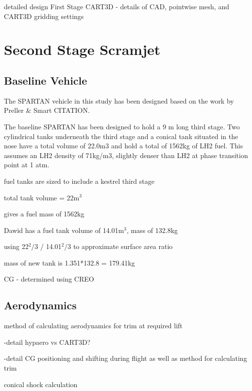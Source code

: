 	detailed design
	First Stage CART3D
	- details of CAD, pointwise mesh, and CART3D gridding settings
	
	
	\section{Second Stage Scramjet}
		\subsection{Baseline Vehicle}
		The SPARTAN vehicle in this study has been designed based on the work by Preller \& Smart CITATION. 
		
		The baseline SPARTAN has been designed to hold a 9 m long third stage.  Two cylindrical tanks underneath the third stage and a conical tank situated in the nose have a total volume of 22.0m3 and hold a total of 1562kg of LH2 fuel. This assumes an LH2 density of 71kg/m3, slightly denser than LH2 at phase transition point at 1 atm.
		
		
		
		
		
		
		
		fuel tanks are sized to include a kestrel third stage
		
		total tank volume = 22m$^3$
		
		gives a fuel mass of 1562kg
		
		
		
		Dawid has a fuel tank volume of 14.01m$^3$, mass of 132.8kg
		
		using 22$^2/3$  /  14.01$^2/3$  to approximate surface area ratio
		
		mass of new tank is 1.351*132.8 = 179.41kg
		
		
		CG - determined using CREO
		
		\subsection{Aerodynamics}
		method of calculating aerodynamics for trim at required lift
		
		-detail hypaero vs CART3D? 
		
		-detail  CG positioning and shifting during flight as well as method for calculating trim
		
		conical shock calculation
		
